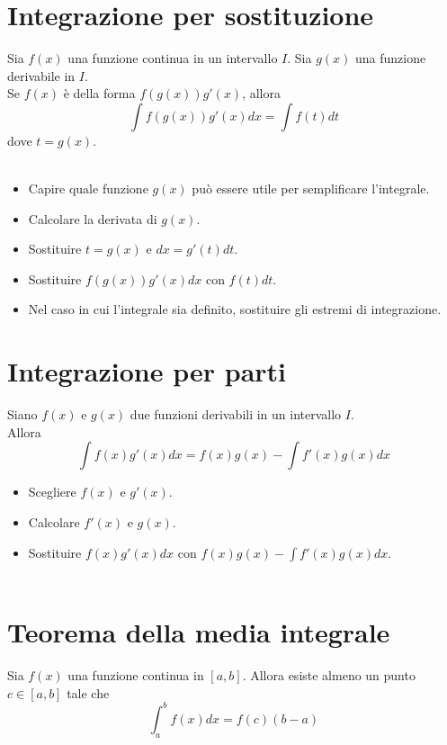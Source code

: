 \documentclass{article}
\begin{document}
\section*{Integrazione per sostituzione}
Sia $f(x)$ una funzione continua in un intervallo $I$. Sia $g(x)$ una funzione derivabile in $I$.\\
Se $f(x)$ è della forma $f(g(x))g'(x)$, allora
\begin{equation*}
    \int f(g(x))g'(x)dx = \int f(t)dt
\end{equation*}
dove $t=g(x)$.\\\\
\begin{itemize}
    \item Capire quale funzione $g(x)$ può essere utile per semplificare l'integrale.
    \item Calcolare la derivata di $g(x)$.
    \item Sostituire $t=g(x)$ e $dx=g'(t)dt$.
    \item Sostituire $f(g(x))g'(x)dx$ con $f(t)dt$.
    \item Nel caso in cui l'integrale sia definito, sostituire gli estremi di integrazione.
\end{itemize}
\section*{Integrazione per parti}
Siano $f(x)$ e $g(x)$ due funzioni derivabili in un intervallo $I$.\\
Allora
\begin{equation*}
    \int f(x)g'(x)dx = f(x)g(x) - \int f'(x)g(x)dx
\end{equation*}
\begin{itemize}
    \item Scegliere $f(x)$ e $g'(x)$.
    \item Calcolare $f'(x)$ e $g(x)$.
    \item Sostituire $f(x)g'(x)dx$ con $f(x)g(x)-\int f'(x)g(x)dx$.\\\\
\end{itemize}
\newpage
\section*{Teorema della media integrale}
Sia $f(x)$ una funzione continua in $[a,b]$. Allora esiste almeno un punto $c \in [a,b]$ tale che
\begin{equation*}
    \int_a^b f(x)dx = f(c)(b-a)
\end{equation*}
\end{document}

